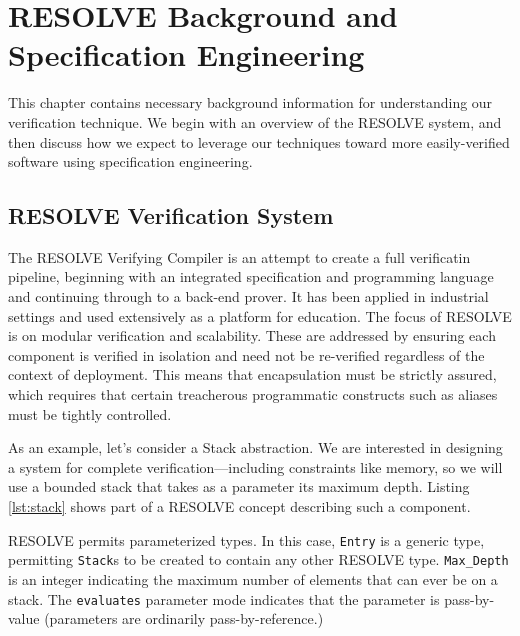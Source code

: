 \chapter{RESOLVE Background and Specification Engineering}\label{ch:resolveBackground}

This chapter contains necessary background information for understanding our verification technique.  We begin with an overview of the RESOLVE system, and then discuss how we expect to leverage our techniques toward more easily-verified software using specification engineering.


\section{RESOLVE Verification System}

The RESOLVE\cite{RESOLVE} Verifying Compiler is an attempt to create a full verificatin pipeline, beginning with an integrated specification and programming language and continuing through to a back-end prover.  It has been applied in industrial settings\cite{hollingsworth2000experience} and used extensively as a platform for education\cite{leonard2009injecting, sitaraman2009engaging, sitaraman2001formal}.  The focus of RESOLVE is on modular verification and scalability.  These are addressed by ensuring each component is verified in isolation and need not be re-verified regardless of the context of deployment.  This means that encapsulation must be strictly assured, which requires that certain treacherous programmatic constructs such as aliases must be tightly controlled.

As an example, let's consider a Stack abstraction.  We are interested in designing a system for complete verification---including constraints like memory, so we will use a bounded stack that takes as a parameter its maximum depth.  Listing \ref{lst:stack} shows part of a RESOLVE concept describing such a component.



RESOLVE permits parameterized types.  In this case, \texttt{Entry} is a generic type, permitting \texttt{Stack}s to be created to contain any other RESOLVE type.  \texttt{Max\_Depth} is an integer indicating the maximum number of elements that can ever be on a stack.  The \texttt{evaluates} parameter mode indicates that the parameter is pass-by-value (parameters are ordinarily pass-by-reference.)

